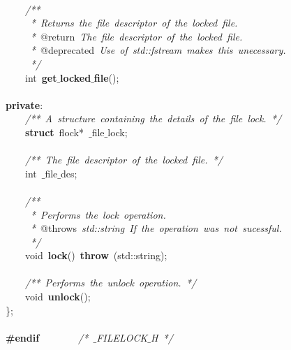 \mbox{} \\
\mbox{}\ \ \ \ \textit{/**} \\
\mbox{}\textit{\ \ \ \ \ *\ Returns\ the\ file\ descriptor\ of\ the\ locked\ file.} \\
\mbox{}\textit{\ \ \ \ \ *\ }@return\textit{\ The\ file\ descriptor\ of\ the\ locked\ file.} \\
\mbox{}\textit{\ \ \ \ \ *\ }@deprecated\textit{\ Use\ of\ std::fstream\ makes\ this\ unecessary.} \\
\mbox{}\textit{\ \ \ \ \ */} \\
\mbox{}\ \ \ \ int\ \textbf{get$\_$locked$\_$file}(); \\
\mbox{} \\
\mbox{}\textbf{private}: \\
\mbox{}\ \ \ \ \textit{/**\ A\ structure\ containing\ the\ details\ of\ the\ file\ lock.\ */} \\
\mbox{}\ \ \ \ \textbf{struct}\ flock*\ $\_$file$\_$lock; \\
\mbox{} \\
\mbox{}\ \ \ \ \textit{/**\ The\ file\ descriptor\ of\ the\ locked\ file.\ */} \\
\mbox{}\ \ \ \ int\ $\_$file$\_$des; \\
\mbox{} \\
\mbox{}\ \ \ \ \textit{/**} \\
\mbox{}\textit{\ \ \ \ \ *\ Performs\ the\ lock\ operation.} \\
\mbox{}\textit{\ \ \ \ \ *\ }@throws\textit{\ std::string\ If\ the\ operation\ was\ not\ sucessful.} \\
\mbox{}\textit{\ \ \ \ \ */} \\
\mbox{}\ \ \ \ void\ \textbf{lock}()\ \textbf{throw}\ (std::string); \\
\mbox{} \\
\mbox{}\ \ \ \ \textit{/**\ Performs\ the\ unlock\ operation.\ */} \\
\mbox{}\ \ \ \ void\ \textbf{unlock}(); \\
\mbox{}\}; \\
\mbox{} \\
\mbox{}\textbf{\#endif}\ \ \ \ \ \ \ \ \textit{/*\ $\_$FILELOCK$\_$H\ */} \\
\mbox{} \\

\clearpage
\normalsize
\rmfamily
